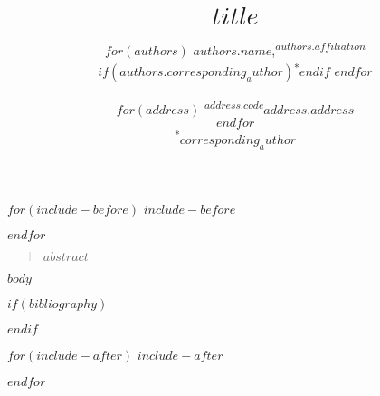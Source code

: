 \documentclass[12pt]{article}
\title{\bf $title$}
\author{
$for(authors)$
$authors.name$,\textsuperscript{$authors.affiliation$}$if(authors.corresponding_author)$\textsuperscript{*}$endif$
$endfor$\\
\\
$for(address)$
\normalsize{\textsuperscript{$address.code$}$address.address$}\\
$endfor$
\\
\textsuperscript{*}$corresponding_author$
}
\date{}
\newenvironment{sciabstract}{%
\begin{quote} \singlespacing}
{\end{quote}}
\begin{document}
$for(include-before)$
$include-before$

$endfor$

\baselineskip24pt


\maketitle


\begin{sciabstract}
$abstract$
\end{sciabstract}

$body$

$if(bibliography)$


$endif$

$for(include-after)$
$include-after$

$endfor$

\renewcommand{\thetable}{\arabic{table}}
\renewcommand{\thefigure}{\arabic{figure}}
\setcounter{table}{0}
\setcounter{figure}{0}









\end{document}
